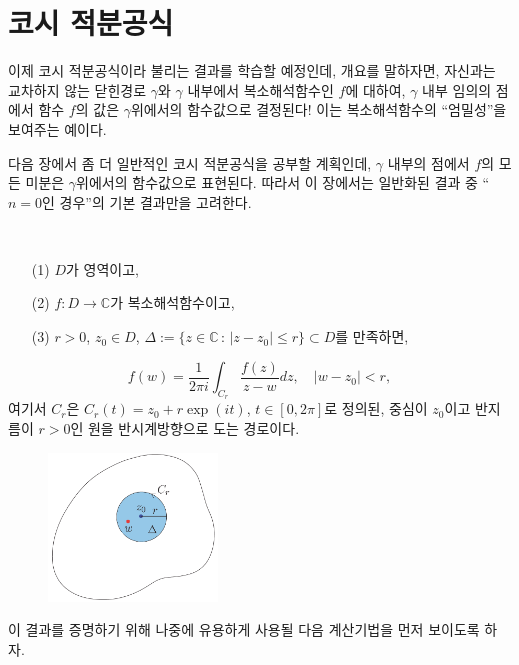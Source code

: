 \section{코시 적분공식}

이제 코시 적분공식이라 불리는 결과를 학습할 예정인데,
개요를 말하자면, 자신과는 교차하지 않는 닫힌경로 $\gamma$와
$\gamma$ 내부에서 복소해석함수인 $f$에 대하여,
$\gamma$ 내부 임의의 점에서 함수 $f$의 값은
$\gamma$위에서의 함수값으로 결정된다!
이는 복소해석함수의 ``엄밀성''을 보여주는 예이다.

다음 장에서 좀 더 일반적인 코시 적분공식을 공부할 계획인데,
$\gamma$ 내부의 점에서 $f$의 모든 미분은 
$\gamma$위에서의 함수값으로 표현된다.
따라서 이 장에서는 일반화된 결과 중 ``$n=0$인 경우''의 기본 결과만을 고려한다.

\begin{salt_theorem} \label{thm-3-6}
\
\begin{itemize}
\item[(1)] $D$가 영역이고,
\item[(2)] $f:D\to\mathbb C$가 복소해석함수이고,
\item[(3)] $r>0$, $z_0\in D$, 
$\Delta := \{ z\in \mathbb C\,:\, |z-z_0| \le r\} \subset D$를 만족하면,
\end{itemize}
\[
f(w) = \dfrac1{2\pi i} \int_{C_r} \dfrac{f(z)}{z-w} dz, 
\quad |w-z_0| <r,
\]
여기서 $C_r$은 $C_r(t) = z_0 + r\exp(it)$, $t\in [0,2\pi]$로 
정의된, 중심이 $z_0$이고 반지름이 $r>0$인 
원을 반시계방향으로 도는 경로이다.

\begin{figure}[h!]
\begin{center}
\includegraphics[width=0.4\textwidth]{./SaltChapter/fig-3-0-7}
\end{center}
\end{figure}
\end{salt_theorem}

이 결과를 증명하기 위해 나중에 유용하게 사용될 다음 계산기법을 먼저 보이도록 하자.


